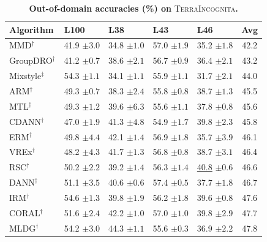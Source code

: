\documentclass[10pt]{article}
\newcommand{\data}[1]{\textsc{#1}}
\begin{document}
\begin{table}[H]
\centering
\small
\renewcommand{\arraystretch}{1.1}
\caption{\small\textbf{Out-of-domain accuracies (\%) on} \data{TerraIncognita}\textbf{.}}
\begin{tabular}{lllll|c}
\toprule
\textbf{Algorithm} & \textbf{L100} & \textbf{L38} & \textbf{L43} & \textbf{L46} & \textbf{Avg} \\
\midrule
MMD$^\dagger$ & 41.9 \scriptsize$\pm3.0$ & 34.8 \scriptsize$\pm1.0$ & 57.0 \scriptsize$\pm1.9$ & 35.2 \scriptsize$\pm1.8$ & 42.2 \\
GroupDRO$^\dagger$ & 41.2 \scriptsize$\pm0.7$ & 38.6 \scriptsize$\pm2.1$ & 56.7 \scriptsize$\pm0.9$ & 36.4 \scriptsize$\pm2.1$ & 43.2 \\
Mixstyle$^\ddagger$ & 54.3 \scriptsize$\pm1.1$ & 34.1 \scriptsize$\pm1.1$ & 55.9 \scriptsize$\pm1.1$ & 31.7 \scriptsize$\pm2.1$ & 44.0 \\
ARM$^\dagger$ & 49.3 \scriptsize$\pm0.7$ & 38.3 \scriptsize$\pm2.4$ & 55.8 \scriptsize$\pm0.8$ & 38.7 \scriptsize$\pm1.3$ & 45.5 \\
MTL$^\dagger$ & 49.3 \scriptsize$\pm1.2$ & 39.6 \scriptsize$\pm6.3$ & 55.6 \scriptsize$\pm1.1$ & 37.8 \scriptsize$\pm0.8$ & 45.6 \\
CDANN$^\dagger$ & 47.0 \scriptsize$\pm1.9$ & 41.3 \scriptsize$\pm4.8$ & 54.9 \scriptsize$\pm1.7$ & 39.8 \scriptsize$\pm2.3$ & 45.8 \\
ERM$^\dagger$ & 49.8 \scriptsize$\pm4.4$ & 42.1 \scriptsize$\pm1.4$ & 56.9 \scriptsize$\pm1.8$ & 35.7 \scriptsize$\pm3.9$ & 46.1 \\
VREx$^\dagger$ & 48.2 \scriptsize$\pm4.3$ & 41.7 \scriptsize$\pm1.3$ & 56.8 \scriptsize$\pm0.8$ & 38.7 \scriptsize$\pm3.1$ & 46.4 \\
RSC$^\dagger$ & 50.2 \scriptsize$\pm2.2$ & 39.2 \scriptsize$\pm1.4$ & 56.3 \scriptsize$\pm1.4$ & \underline{40.8} \scriptsize$\pm0.6$ & 46.6 \\
DANN$^\dagger$ & 51.1 \scriptsize$\pm3.5$ & 40.6 \scriptsize$\pm0.6$ & 57.4 \scriptsize$\pm0.5$ & 37.7 \scriptsize$\pm1.8$ & 46.7 \\
IRM$^\dagger$ & 54.6 \scriptsize$\pm1.3$ & 39.8 \scriptsize$\pm1.9$ & 56.2 \scriptsize$\pm1.8$ & 39.6 \scriptsize$\pm0.8$ & 47.6 \\
CORAL$^\dagger$ & 51.6 \scriptsize$\pm2.4$ & 42.2 \scriptsize$\pm1.0$ & 57.0 \scriptsize$\pm1.0$ & 39.8 \scriptsize$\pm2.9$ & 47.7 \\
MLDG$^\dagger$ & 54.2 \scriptsize$\pm3.0$ & 44.3 \scriptsize$\pm1.1$ & 55.6 \scriptsize$\pm0.3$ & 36.9 \scriptsize$\pm2.2$ & 47.8 \\

\end{tabular}
\end{table}
\end{document}
